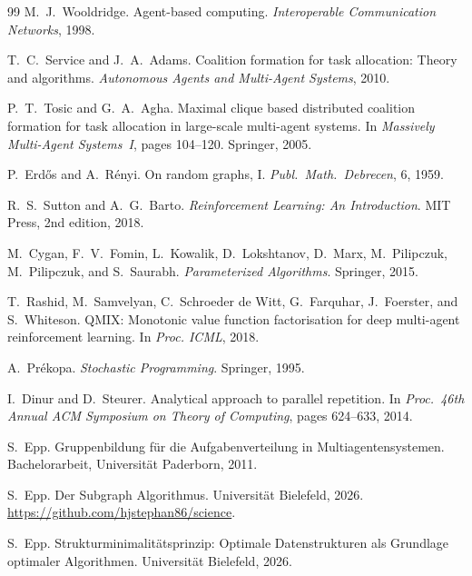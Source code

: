 \documentclass[a4paper,12pt]{article}
\theoremstyle{definition}
\begin{document}
\begin{thebibliography}{99}
M.\ J.\ Wooldridge.
\newblock Agent-based computing.
\newblock \textit{Interoperable Communication Networks}, 1998.

T.\ C.\ Service and J.\ A.\ Adams.
\newblock Coalition formation for task allocation: Theory and algorithms.
\newblock \textit{Autonomous Agents and Multi-Agent Systems}, 2010.

P.\ T.\ Tosic and G.\ A.\ Agha.
\newblock Maximal clique based distributed coalition formation for task
         allocation in large-scale multi-agent systems.
\newblock In \textit{Massively Multi-Agent Systems~I}, pages 104--120.
         Springer, 2005.

P.\ Erd\H{o}s and A.\ R\'{e}nyi.
\newblock On random graphs, I.
\newblock \textit{Publ.\ Math.\ Debrecen}, 6, 1959.

R.\ S.\ Sutton and A.\ G.\ Barto.
\newblock \textit{Reinforcement Learning: An Introduction}.
\newblock MIT Press, 2nd edition, 2018.

M.\ Cygan, F.\ V.\ Fomin, L.\ Kowalik, D.\ Lokshtanov, D.\ Marx,
M.\ Pilipczuk, M.\ Pilipczuk, and S.\ Saurabh.
\newblock \textit{Parameterized Algorithms}.
\newblock Springer, 2015.

T.\ Rashid, M.\ Samvelyan, C.\ Schroeder de Witt, G.\ Farquhar, J.\ Foerster,
and S.\ Whiteson.
\newblock QMIX: Monotonic value function factorisation for deep multi-agent
         reinforcement learning.
\newblock In \textit{Proc. ICML}, 2018.

A.\ Pr\'{e}kopa.
\newblock \textit{Stochastic Programming}.
\newblock Springer, 1995.

I.\ Dinur and D.\ Steurer.
\newblock Analytical approach to parallel repetition.
\newblock In \textit{Proc.\ 46th Annual ACM Symposium on Theory of Computing},
         pages 624--633, 2014.

S.\ Epp.
\newblock Gruppenbildung f\"{u}r die Aufgabenverteilung in Multiagentensystemen.
\newblock Bachelorarbeit, Universit\"{a}t Paderborn, 2011.

S.\ Epp.
\newblock Der Subgraph Algorithmus.
\newblock Universit\"{a}t Bielefeld, 2026.
\newblock \url{https://github.com/hjstephan86/science}.

S.\ Epp.
\newblock Strukturminimalit\"{a}tsprinzip: Optimale Datenstrukturen als
         Grundlage optimaler Algorithmen.
\newblock Universit\"{a}t Bielefeld, 2026.

\end{thebibliography}
\end{document}
